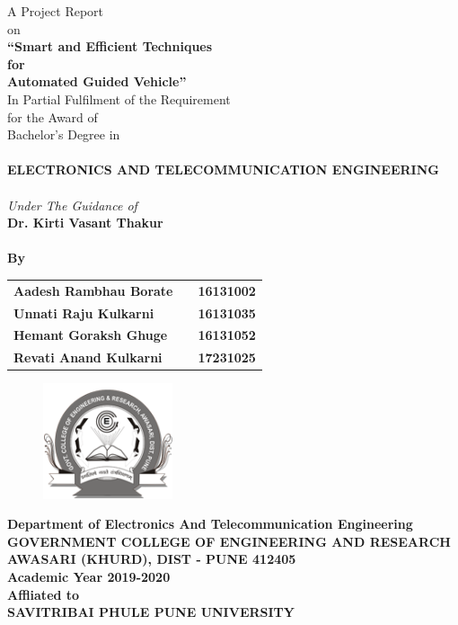 \newpage
\begin{center}
\thispagestyle{empty}
\Large{A Project Report\\ \large{on}}\\[0.7cm]
\LARGE{{\textbf{``Smart and Efficient Techniques \\ for \\ Automated Guided Vehicle''}}}\\[0.5cm]
\large{In Partial Fulfilment of the Requirement \\ for the Award of \\ Bachelor's Degree in\\}
\Large{\textbf{\\ELECTRONICS AND TELECOMMUNICATION ENGINEERING\\}}
\large{\textit{\\Under The Guidance of}}\\
\large{\textbf{Dr. Kirti Vasant Thakur}}\\
\large{\textbf{\\By}}\\[0.5cm]
\begin{table}[h]
\centering
\large{
\begin{tabular}{>{\bfseries}lc>{\bfseries}r}
Aadesh Rambhau Borate & & 16131002\\Unnati Raju Kulkarni & & 16131035\\Hemant Goraksh Ghuge & & 16131052\\Revati Anand Kulkarni & & 17231025\\
\end{tabular}}
\end{table}
\begin{figure}[htbp]
\centering
\includegraphics[width=1.5in]{project/images/govt-college-logo.png}
\end{figure}
\large{\textbf{Department of Electronics And Telecommunication Engineering}}\\
\Large{\textbf{GOVERNMENT COLLEGE OF ENGINEERING AND RESEARCH}}\\
\large{\textbf{AWASARI (KHURD), DIST - PUNE 412405}}
\large{\textbf{\\Academic Year 2019-2020}}\\
\large{\textbf{Affliated to\\}}
\large{\textbf{SAVITRIBAI PHULE PUNE UNIVERSITY}}
\newpage
\end{center}
